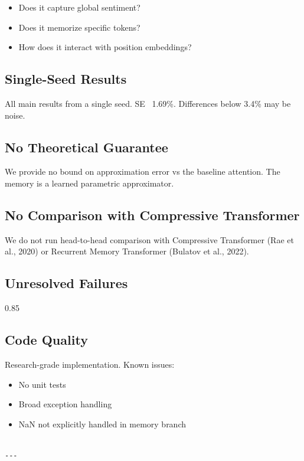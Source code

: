 \begin{itemize}
\item Does it capture global sentiment?
\item Does it memorize specific tokens?
\item How does it interact with position embeddings?

\end{itemize}
\subsection{Single-Seed Results}

All main results from a single seed. SE ~1.69\%. Differences below 3.4\% 
may be noise.

\subsection{No Theoretical Guarantee}

We provide no bound on approximation error vs the baseline attention. 
The memory is a learned parametric approximator.

\subsection{No Comparison with Compressive Transformer}

We do not run head-to-head comparison with Compressive Transformer (Rae et 
al., 2020) or Recurrent Memory Transformer (Bulatov et al., 2022).

\subsection{Unresolved Failures}

0.85

\subsection{Code Quality}

Research-grade implementation. Known issues:

\begin{itemize}
\item No unit tests
\item Broad exception handling
\item NaN not explicitly handled in memory branch
\end{itemize}
\begin{lstlisting}

---
\end{lstlisting}


